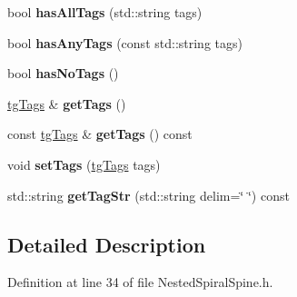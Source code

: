 \begin{DoxyCompactItemize}
\item 
\hypertarget{classtg_taggable_a33b77b1075171b63f673965687b2e844}{bool {\bfseries has\-All\-Tags} (std\-::string tags)}\label{classtg_taggable_a33b77b1075171b63f673965687b2e844}

\item 
\hypertarget{classtg_taggable_af14af28fa98021c4f20a5e8f2ddd5606}{bool {\bfseries has\-Any\-Tags} (const std\-::string tags)}\label{classtg_taggable_af14af28fa98021c4f20a5e8f2ddd5606}

\item 
\hypertarget{classtg_taggable_adff345e116e16420c701a748ff8f995f}{bool {\bfseries has\-No\-Tags} ()}\label{classtg_taggable_adff345e116e16420c701a748ff8f995f}

\item 
\hypertarget{classtg_taggable_acf1d7fa9df8f374f25015c4080902681}{\hyperlink{classtg_tags}{tg\-Tags} \& {\bfseries get\-Tags} ()}\label{classtg_taggable_acf1d7fa9df8f374f25015c4080902681}

\item 
\hypertarget{classtg_taggable_ae70d7d3b45301665bc363b0ed8b9b292}{const \hyperlink{classtg_tags}{tg\-Tags} \& {\bfseries get\-Tags} () const }\label{classtg_taggable_ae70d7d3b45301665bc363b0ed8b9b292}

\item 
\hypertarget{classtg_taggable_a5492888e4e4da4cca6261070b5726adf}{void {\bfseries set\-Tags} (\hyperlink{classtg_tags}{tg\-Tags} tags)}\label{classtg_taggable_a5492888e4e4da4cca6261070b5726adf}

\item 
\hypertarget{classtg_taggable_a346d66b066d2d9eb1eadba01da43749f}{std\-::string {\bfseries get\-Tag\-Str} (std\-::string delim=\char`\"{} \char`\"{}) const }\label{classtg_taggable_a346d66b066d2d9eb1eadba01da43749f}

\end{DoxyCompactItemize}


\subsection{Detailed Description}


Definition at line 34 of file Nested\-Spiral\-Spine.\-h.



